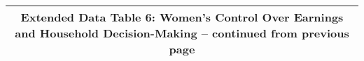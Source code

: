 \begin{longtable}{llcccccccccc}
\multicolumn{12}{c}{{\bfseries Extended Data Table 6: Women's Control Over Earnings and Household Decision-Making -- continued from previous page}} \\ \hline                                                                                                                                                                                                                                                                                                                                                                                                                                                                                                                                                                                                                                                                                                                                                     

\end{longtable}
